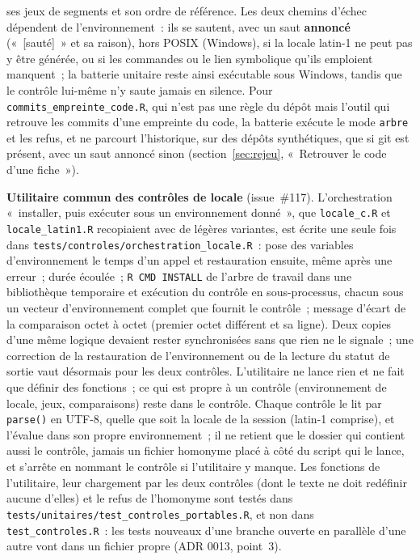\documentclass[a4paper,11pt]{article}
\newcommand{\code}[1]{\texttt{\small #1}}
\begin{document}
ses jeux de segments et son ordre de référence. Les deux chemins d'échec
dépendent de l'environnement~: ils se sautent, avec un saut
\textbf{annoncé} («~[sauté]~» et sa raison), hors POSIX (Windows), si la
locale latin-1 ne peut pas y être générée, ou si les commandes ou le lien
symbolique qu'ils emploient manquent~; la batterie unitaire reste ainsi
exécutable sous Windows, tandis que le contrôle lui-même n'y saute jamais
en silence. Pour \code{commits\_empreinte\_code.R}, qui n'est pas une règle
du dépôt mais l'outil qui retrouve les commits d'une empreinte du code, la
batterie exécute le mode \code{arbre} et les refus, et ne parcourt
l'historique, sur des dépôts synthétiques, que si git est présent, avec un
saut annoncé sinon (section~\ref{sec:rejeu}, «~Retrouver le code d'une
fiche~»).

\textbf{Utilitaire commun des contrôles de locale} (issue~\#117).
L'orchestration «~installer, puis exécuter sous un environnement
donné~», que \code{locale\_c.R} et \code{locale\_latin1.R} recopiaient avec
de légères variantes, est écrite une seule fois dans
\code{tests/controles/orchestration\_locale.R}~: pose des variables
d'environnement le temps d'un appel et restauration ensuite, même après une
erreur~; durée écoulée~; \code{R CMD INSTALL} de l'arbre de travail dans une
bibliothèque temporaire et exécution du contrôle en sous-processus, chacun
sous un vecteur d'environnement complet que fournit le contrôle~; message
d'écart de la comparaison octet à octet (premier octet différent et sa
ligne). Deux copies d'une même logique devaient rester synchronisées sans
que rien ne le signale~; une correction de la restauration de
l'environnement ou de la lecture du statut de sortie vaut désormais pour
les deux contrôles. L'utilitaire ne lance rien et ne fait que définir des
fonctions~; ce qui est propre à un contrôle (environnement de locale, jeux,
comparaisons) reste dans le contrôle. Chaque contrôle le lit par
\code{parse()} en UTF-8, quelle que soit la locale de la session
(latin-1 comprise), et l'évalue dans son propre environnement~; il ne
retient que le dossier qui contient aussi le contrôle, jamais un fichier
homonyme placé à côté du script qui le lance, et s'arrête en nommant le
contrôle si l'utilitaire y manque. Les fonctions de l'utilitaire, leur
chargement par les deux contrôles (dont le texte ne doit redéfinir aucune
d'elles) et le refus de l'homonyme sont testés dans
\code{tests/unitaires/test\_controles\_portables.R}, et non dans
\code{test\_controles.R}~: les tests nouveaux d'une branche ouverte en
parallèle d'une autre vont dans un fichier propre (ADR 0013, point~3).
\end{document}
